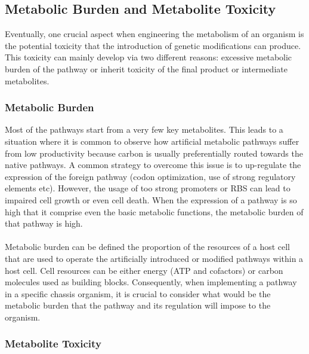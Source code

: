 \subsection{Metabolic Burden and Metabolite Toxicity}
Eventually, one crucial aspect when engineering the metabolism of an organism is the potential toxicity that the introduction of genetic modifications can produce. This toxicity can mainly develop via two different reasons: excessive metabolic burden of the pathway or inherit toxicity of the final product or intermediate metabolites.

\subsubsection{Metabolic Burden}
Most of the pathways start from a very few key metabolites. This leads to a situation where it is common to observe how artificial metabolic pathways suffer from low productivity because carbon is usually preferentially routed towards the native pathways. A common strategy to overcome this issue is to up-regulate the expression of the foreign pathway (codon optimization, use of strong regulatory elements etc). However, the usage of too strong promoters or RBS can lead to impaired cell growth or even cell death. When the expression of a pathway is so high that it comprise even the basic metabolic functions, the metabolic burden of that pathway is high. \\ \\
Metabolic burden can be defined the proportion of the resources of a host cell that are used to operate the artificially introduced or modified pathways  within a host cell. Cell resources can be either energy (ATP and cofactors) or carbon molecules used as building blocks. Consequently, when implementing a pathway in a specific chassis organism, it is crucial to consider what would be the metabolic burden that the pathway and its regulation will impose to the organism.
 
\subsubsection{Metabolite Toxicity}
 
